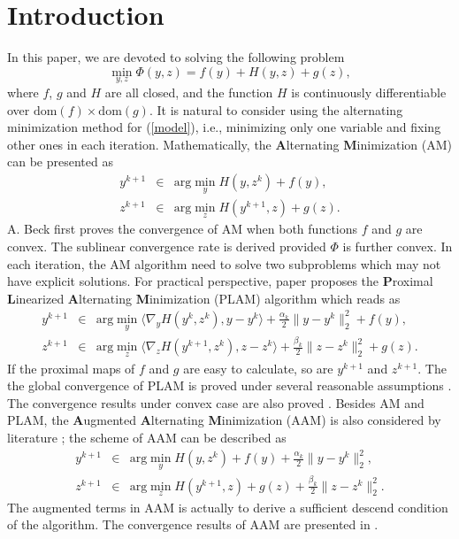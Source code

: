 \documentclass[12pt]{article}
\begin{document}
\section{Introduction}
In this paper, we are devoted to solving the following  problem
\begin{equation}\label{model}
    \min_{y,z} \Phi(y,z)=f(y)+H(y,z)+g(z),
\end{equation}
where $f$, $g$ and $H$ are all closed, and the function $H$ is continuously differentiable over $\textrm{dom}(f)\times \textrm{dom}(g)$.
It is natural to consider using the alternating minimization method for (\ref{model}), i.e., minimizing only one variable and fixing other ones in each iteration. Mathematically, the \textbf{A}lternating \textbf{M}inimization (AM) can be presented as
\begin{eqnarray}
y^{k+1}&\in& \textrm{arg}\min_{y} H(y,z^k)+f(y),\nonumber\\
z^{k+1}&\in& \textrm{arg}\min_{z} H(y^{k+1},z)+g(z).\nonumber
\end{eqnarray}
 A. Beck first proves the convergence of  AM when both functions $f$ and $g$ are convex\cite{beck2015convergence}. The sublinear convergence rate is derived provided $\Phi$ is further convex\cite{beck2015convergence}. In each iteration, the AM algorithm need to solve two subproblems which may not have explicit solutions.   For practical perspective, paper \cite{bolte2014proximal} proposes the  \textbf{P}roximal \textbf{L}inearized \textbf{A}lternating \textbf{M}inimization (PLAM) algorithm which reads as
\begin{eqnarray}
y^{k+1}&\in& \textrm{arg}\min_{y} \langle\nabla_y H(y^k,z^k),y-y^k\rangle+\frac{\alpha_k}{2}\|y-y^k\|_2^2+f(y),\nonumber\\
z^{k+1}&\in& \textrm{arg}\min_{z} \langle\nabla_z H(y^{k+1},z^k),z-z^k\rangle+\frac{\beta_k}{2}\|z-z^k\|_2^2+g(z).\nonumber
\end{eqnarray}
If the proximal maps of $f$ and $g$ are easy to calculate, so are $y^{k+1}$ and $z^{k+1}$. The the global convergence of PLAM is proved under several reasonable assumptions \cite{bolte2014proximal}. The convergence results under convex case are also proved  \cite{shefi2015rate}. Besides AM and PLAM, the \textbf{A}ugmented  \textbf{A}lternating \textbf{M}inimization (AAM) is also considered by literature \cite{attouch2010proximal}; the scheme of AAM can be described as
 \begin{eqnarray}
y^{k+1}&\in& \textrm{arg}\min_{y} H(y,z^k)+f(y)+\frac{\alpha_k}{2}\|y-y^k\|_2^2,\nonumber\\
z^{k+1}&\in& \textrm{arg}\min_{z} H(y^{k+1},z)+g(z)+\frac{\beta_k}{2}\|z-z^k\|_2^2.\nonumber
\end{eqnarray}
The augmented terms in AAM is actually to derive a sufficient descend condition of the algorithm.  The convergence results of AAM are presented in \cite{attouch2010proximal}.
\end{document}

